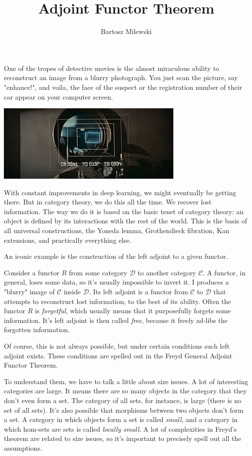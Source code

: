 \documentclass[11pt]{amsart}
\author{Bartosz Milewski}
\title{Adjoint Functor Theorem}
\newcommand{\cat}[1]{\mathcal{#1}}
\begin{document}
\maketitle{}

One of the tropes of detective movies is the almost miraculous ability to reconstruct an image from a blurry photograph. You just scan the picture,  say "enhance!", and voila, the face of the suspect or the registration number of their car appear on your computer screen. 

\includegraphics{BladeRunner.jpeg}

With constant improvements in deep learning, we might eventually be getting there. But in category theory, we do this all the time. We recover lost information. The way we do it is based on the basic tenet of category theory: an object is defined by its interactions with the rest of the world. This is the basis of all universal constructions, the Yoneda lemma, Grothendieck fibration, Kan extensions, and practically everything else. 

An iconic example is the construction of the left adjoint to a given functor. 

Consider a functor $R$ from some category $\cat D$ to another category $\cat C$. A functor, in general, loses some data, so it's usually impossible to invert it. I produces a "blurry" image of $\cat C$ inside $\cat D$. Its left adjoint is a functor from $\cat C$ to $\cat D$ that attempts to reconstruct lost information, to the best of its ability. Often the functor $R$ is \emph{forgetful}, which usually means that it purposefully forgets some information. It's left adjoint is then called \emph{free}, because it freely ad-libs the forgotten information. 


Of course, this is not always possible, but under certain conditions such left adjoint exists. These conditions are spelled out in the Freyd General Adjoint Functor Theorem. 

To understand them, we have to talk a little about size issues. A lot of interesting categories are large. It means there are so many objects in the category that they don't even form a set. The category of all sets, for instance, is large (there is no set of all sets). It's also possible that morphisms between two objects don't form a set. A category in which objects form a set is called \emph{small}, and a category in which hom-sets are sets is called \emph{locally small}. A lot of complexities in Freyd's theorem are related to size issues, so it's important to precisely spell out all the assumptions.
\end{document}
